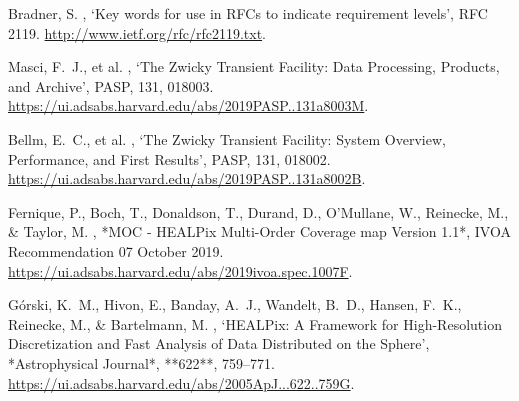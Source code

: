 \documentclass[11pt,a4paper]{ivoa}
\begin{document}
% 
\begin{thebibliography}{}

Bradner, S.  \harvardyearright , `Key words for use in
  {RFCs} to indicate requirement levels', RFC 2119.
\newblock \url{http://www.ietf.org/rfc/rfc2119.txt}.

Masci, F.~J., et al. \harvardyearright,
`The Zwicky Transient Facility: Data Processing, Products, and Archive',
PASP, 131, 018003. \url{https://ui.adsabs.harvard.edu/abs/2019PASP..131a8003M}.

Bellm, E.~C., et al. \harvardyearright,
`The Zwicky Transient Facility: System Overview, Performance, and First Results',
PASP, 131, 018002. \url{https://ui.adsabs.harvard.edu/abs/2019PASP..131a8002B}.

Fernique, P., Boch, T., Donaldson, T., Durand, D., O'Mullane, W., Reinecke, M., \& Taylor, M.  
\harvardyearright,  
*MOC - HEALPix Multi-Order Coverage map Version 1.1*,  
IVOA Recommendation 07 October 2019.  
\url{https://ui.adsabs.harvard.edu/abs/2019ivoa.spec.1007F}.

G{\'o}rski, K.~M., Hivon, E., Banday, A.~J., Wandelt, B.~D., Hansen, F.~K., Reinecke, M., \& Bartelmann, M.  
\harvardyearright,  
`HEALPix: A Framework for High-Resolution Discretization and Fast Analysis of Data Distributed on the Sphere',  
*Astrophysical Journal*, **622**, 759–771.  
\url{https://ui.adsabs.harvard.edu/abs/2005ApJ...622..759G}.

\end{thebibliography}
\end{document}
